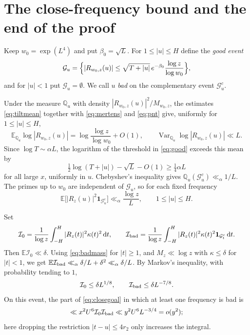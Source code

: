 \documentclass[11pt]{amsart}
\theoremstyle{remark}
\numberwithin{equation}{section}
\newcommand{\E}{\mathbb{E}}
\newcommand{\Q}{\mathbb{Q}}
\newcommand{\one}{\mathbf{1}}
\newcommand{\Var}{\operatorname{Var}}
\newcommand{\dd}{\,\mathrm{d}}
\begin{document}
\section{The close-frequency bound and the end of the proof}\label{sec:close}

Keep $w_0=\exp(L^4)$ and put $\beta_0=\sqrt L$. For $1\le|u|\le H$ define the \emph{good event}
\begin{equation}\label{eq:good}
\mathcal G_u=\Bigl\{|R_{w_0,z}(u)|\le\sqrt{T+|u|}\,e^{-\beta_0}\frac{\log z}{\log w_0}\Bigr\},
\end{equation}
and for $|u|<1$ put $\mathcal G_u=\emptyset$. We call $u$ \emph{bad} on the complementary event $\mathcal G_u^c$.

Under the measure $\Q_u$ with density $|R_{w_0,z}(u)|^2/M_{w_0,z}$, the estimates \eqref{eq:tiltmean} together with \eqref{eq:mertens} and \eqref{eq:pnt} give, uniformly for $1\le|u|\le H$,
\[
\E_{\Q_u}\log|R_{w_0,z}(u)|=\log\frac{\log z}{\log w_0}+O(1),\qquad\Var_{\Q_u}\log|R_{w_0,z}(u)|\ll L .
\]
Since $\log T\sim\alpha L$, the logarithm of the threshold in \eqref{eq:good} exceeds this mean by
\[
\tfrac12\log(T+|u|)-\sqrt L-O(1)\ge\tfrac14\alpha L
\]
for all large $x$, uniformly in $u$. Chebyshev's inequality gives $\Q_u(\mathcal G_u^c)\ll_\alpha1/L$. The primes up to $w_0$ are independent of $\mathcal G_u$, so for each fixed frequency
\begin{equation}\label{eq:badmass}
\E\bigl[|R_z(u)|^2\one_{\mathcal G_u^c}\bigr]\ll_\alpha\frac{\log z}{L},\qquad1\le|u|\le H .
\end{equation}

Set
\[
\mathcal I_0=\frac1{\log z}\int_{-H}^{H}|R_z(t)|^2\kappa(t)^2\dd t,\qquad\mathcal I_{\rm bad}=\frac1{\log z}\int_{-H}^{H}|R_z(t)|^2\kappa(t)^2\one_{\mathcal G_t^c}\dd t .
\]
Then $\E\mathcal I_0\ll\delta$. Using \eqref{eq:badmass} for $|t|\ge1$, and $M_z\ll\log z$ with $\kappa\le\delta$ for $|t|<1$, we get $\E\mathcal I_{\rm bad}\ll_\alpha\delta/L+\delta^2\ll_\alpha\delta/L$. By Markov's inequality, with probability tending to $1$,
\[
\mathcal I_0\le\delta L^{1/8},\qquad\mathcal I_{\rm bad}\le\delta L^{-7/8}.
\]
On this event, the part of \eqref{eq:closegoal} in which at least one frequency is bad is
\begin{equation}\label{eq:badpart}
\ll x^2U^6\mathcal I_0\mathcal I_{\rm bad}\ll y^2U^6L^{-3/4}=o(y^2);
\end{equation}
here dropping the restriction $|t-u|\le4r_2$ only increases the integral.
\end{document}
